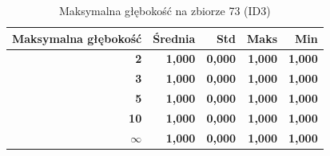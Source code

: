 \begin{table}[htbp]
\centering
\small
\setlength{\tabcolsep}{6pt}
\renewcommand{\arraystretch}{1.2}
\caption{Maksymalna głębokość na zbiorze 73 (ID3)}
\label{tab:ID3_max_depth_73}
\begin{tabular}{r|r|r|r|r}
\toprule
Maksymalna głębokość & Średnia & Std & Maks & Min \\
\hline
\textbf{2} & \textbf{1,000} & \textbf{0,000} & \textbf{1,000} & \textbf{1,000} \\
\textbf{3} & \textbf{1,000} & \textbf{0,000} & \textbf{1,000} & \textbf{1,000} \\
\textbf{5} & \textbf{1,000} & \textbf{0,000} & \textbf{1,000} & \textbf{1,000} \\
\textbf{10} & \textbf{1,000} & \textbf{0,000} & \textbf{1,000} & \textbf{1,000} \\
\textbf{$\infty$} & \textbf{1,000} & \textbf{0,000} & \textbf{1,000} & \textbf{1,000} \\
\bottomrule
\end{tabular}
\end{table}